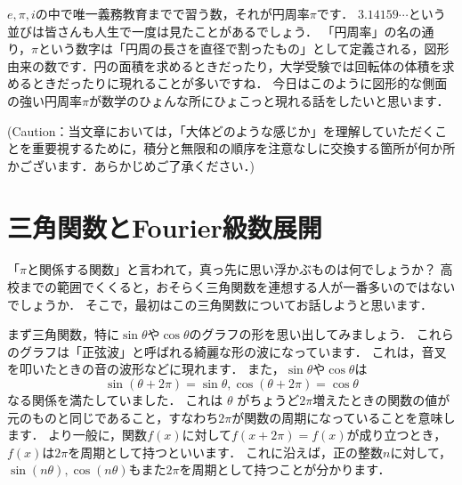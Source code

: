 



$e, \pi , i$の中で唯一義務教育までで習う数，それが円周率$\pi$です．
$3.14159 \cdots$という並びは皆さんも人生で一度は見たことがあるでしょう．
「円周率」の名の通り，$\pi$という数字は「円周の長さを直径で割ったもの」として定義される，図形由来の数です．円の面積を求めるときだったり，大学受験では回転体の体積を求めるときだったりに現れることが多いですね．
今日はこのように図形的な側面の強い円周率$\pi$が数学のひょんな所にひょこっと現れる話をしたいと思います．

(Caution：当文章においては，「大体どのような感じか」を理解していただくことを重要視するために，積分と無限和の順序を注意なしに交換する箇所が何か所かございます．あらかじめご了承ください．)

\section{三角関数とFourier級数展開}

「$\pi$と関係する関数」と言われて，真っ先に思い浮かぶものは何でしょうか？
高校までの範囲でくくると，おそらく三角関数を連想する人が一番多いのではないでしょうか．
そこで，最初はこの三角関数についてお話しようと思います．

まず三角関数，特に$\sin \theta$や$\cos \theta$のグラフの形を思い出してみましょう．
これらのグラフは「正弦波」と呼ばれる綺麗な形の波になっています．
これは，音叉を叩いたときの音の波形などに現れます．
また，$\sin \theta$や$\cos \theta$は
\[
\sin ( \theta +2 \pi )= \sin \theta, \cos( \theta +2 \pi )= \cos \theta
\]
なる関係を満たしていました．
これは $\theta$ がちょうど$2 \pi$増えたときの関数の値が元のものと同じであること，すなわち$2 \pi$が関数の周期になっていることを意味します．
より一般に，関数$f(x)$に対して$f(x+2 \pi )=f(x)$が成り立つとき，$f(x)$は$2 \pi$を周期として持つといいます．
これに沿えば，正の整数$n$に対して，$\sin (n \theta ), \cos (n \theta)$もまた$2 \pi$を周期として持つことが分かります．

